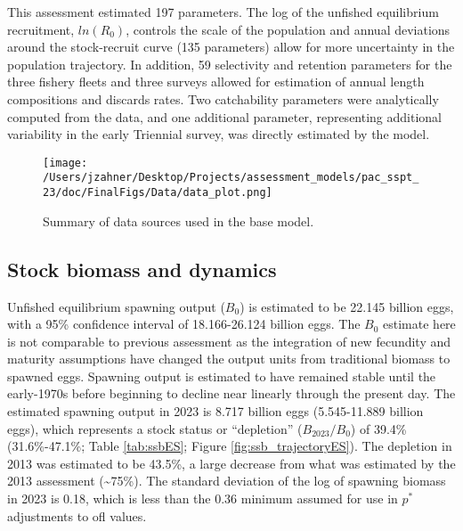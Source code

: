\documentclass[11pt,
  letterpaper,
]{article}
\begin{document}
This assessment estimated 197 parameters. The log of the unfished equilibrium recruitment, \(ln(R_0)\), controls the scale of the population and annual deviations around the stock-recruit curve (135 parameters) allow for more uncertainty in the population trajectory. In addition, 59 selectivity and retention parameters for the three fishery fleets and three surveys allowed for estimation of annual length compositions and discards rates. Two catchability parameters were analytically computed from the data, and one additional parameter, representing additional variability in the early Triennial survey, was directly estimated by the model.

\clearpage

\begin{figure}
{\centering
\texttt{[image: /Users/jzahner/Desktop/Projects/assessment\_models/pac\_sspt\_23/doc/FinalFigs/Data/data\_plot.png]}
}
\caption{Summary of data sources used in the base model.\label{fig:assessment_data_timeseriesES}}
\end{figure}

\hypertarget{stock-biomass-and-dynamics}{%
\subsection*{Stock biomass and dynamics}\label{stock-biomass-and-dynamics}}

Unfished equilibrium spawning output (\(B_0\)) is estimated to be 22.145 billion eggs, with a 95\% confidence interval of 18.166-26.124 billion eggs. The \(B_0\) estimate here is not comparable to previous assessment as the integration of new fecundity and maturity assumptions have changed the output units from traditional biomass to spawned eggs. Spawning output is estimated to have remained stable until the early-1970s before beginning to decline near linearly through the present day. The estimated spawning output in 2023 is 8.717 billion eggs (5.545-11.889 billion eggs), which represents a stock status or ``depletion'' (\(B_{2023}/B_0\)) of 39.4\% (31.6\%-47.1\%; Table \ref{tab:ssbES}; Figure \ref{fig:ssb_trajectoryES}). The depletion in 2013 was estimated to be 43.5\%, a large decrease from what was estimated by the 2013 assessment (\textasciitilde75\%). The standard deviation of the log of spawning biomass in 2023 is 0.18, which is less than the 0.36 minimum assumed for use in \(p^*\) adjustments to \gls{ofl} values.
\end{document}
